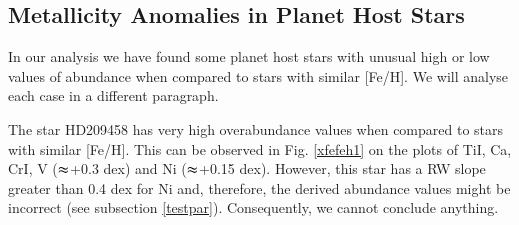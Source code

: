 \documentclass[dvips,12pt,a4paper]{report}
\begin{document}
{{%






\subsection{Metallicity Anomalies in Planet Host Stars}
\label {anomaly}
In our analysis we have found some planet host stars with unusual high or low values of abundance when compared to stars with similar [Fe/H]. We will analyse each case in a different paragraph.

The star HD209458 has very high overabundance values when compared to stars with similar [Fe/H]. This can be observed in Fig. \ref{xfefeh1} on the plots of TiI, Ca, CrI, V ($\thickapprox$+0.3 dex) and Ni ($\thickapprox$+0.15 dex). However, this star has a RW slope greater than 0.4 dex for Ni  and, therefore, the derived abundance values might be incorrect (see subsection \ref{testpar}). Consequently, we cannot conclude anything.  %

}}
\end{document}
